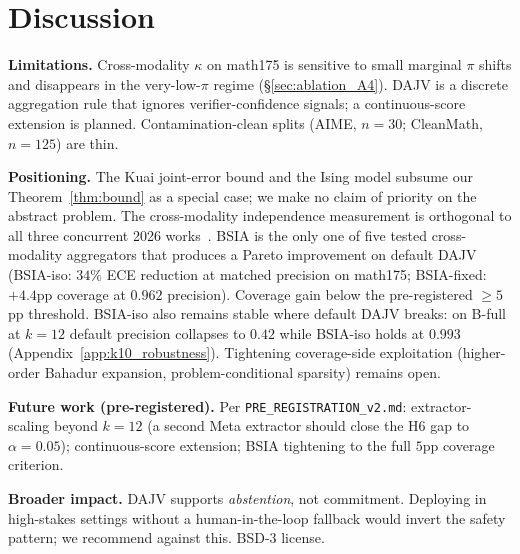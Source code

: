 \section{Discussion}
\label{sec:discussion}

\textbf{Limitations.}
Cross-modality $\kappa$ on math175 is sensitive to small marginal
$\pi$ shifts and disappears in the very-low-$\pi$ regime
(\S\ref{sec:ablation_A4}). DAJV is a discrete aggregation rule
that ignores verifier-confidence signals; a continuous-score
extension is planned. Contamination-clean splits (AIME, $n=30$;
CleanMath, $n=125$) are thin.

\textbf{Positioning.}
The Kuai joint-error bound and the
\citet{balasubramanian2026ising} Ising model subsume our
Theorem~\ref{thm:bound} as a special case; we make no claim of
priority on the abstract problem. The cross-modality independence
measurement is orthogonal to all three concurrent
2026 works~\citep{kuai2026independence,zhao2026care,balasubramanian2026ising}.
BSIA is the only one of five tested cross-modality aggregators
that produces a Pareto improvement on default DAJV (BSIA-iso:
$34\%$ ECE reduction at matched precision on math175; BSIA-fixed:
$+4.4$pp coverage at $0.962$ precision). Coverage gain below the
pre-registered $\geq 5$pp threshold. BSIA-iso also remains stable
where default DAJV breaks: on B-full at $k=12$ default precision
collapses to $0.42$ while BSIA-iso holds at $0.993$
(Appendix~\ref{app:k10_robustness}). Tightening coverage-side
exploitation (higher-order Bahadur expansion,
problem-conditional sparsity) remains open.

\textbf{Future work (pre-registered).}
Per \texttt{PRE\_REGISTRATION\_v2.md}: extractor-scaling beyond
$k=12$ (a second Meta extractor should close the H6 gap to
$\alpha = 0.05$); continuous-score extension; BSIA tightening to
the full $5$pp coverage criterion.

\textbf{Broader impact.}
DAJV supports \emph{abstention}, not commitment. Deploying in
high-stakes settings without a human-in-the-loop fallback would
invert the safety pattern; we recommend against this. BSD-3
license.
